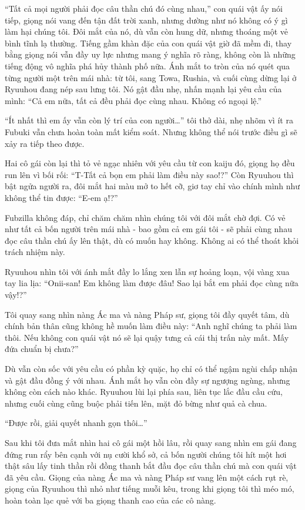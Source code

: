 \documentclass[../main.tex]{subfiles}
\begin{document}

``Tất cả mọi người phải đọc câu thần chú đó cùng nhau,'' con quái vật ấy nói tiếp, giọng nói vang đến tận đất trời xanh, nhưng dường như nó không có ý gì làm hại chúng tôi. Đôi mắt của nó, dù vẫn còn hung dữ, nhưng thoáng một vẻ bình tĩnh lạ thường. Tiếng gầm khàn đặc của con quái vật giờ đã mềm đi, thay bằng giọng nói vẫn đầy uy lực nhưng mang ý nghĩa rõ ràng, không còn là những tiếng động vô nghĩa phá hủy thành phố nữa. Ánh mắt to tròn của nó quét qua từng người một trên mái nhà: từ tôi, sang Towa, Rushia, và cuối cùng dừng lại ở Ryuuhou đang nép sau lưng tôi. Nó gật đầu nhẹ, nhấn mạnh lại yêu cầu của mình: ``Cả em nữa, tất cả đều phải đọc cùng nhau. Không có ngoại lệ.''

``Ít nhất thì em ấy vẫn còn lý trí của con người\dots'' tôi thở dài, nhẹ nhõm vì ít ra Fubuki vẫn chưa hoàn toàn mất kiểm soát. Nhưng không thể nói trước điều gì sẽ xảy ra tiếp theo được.

Hai cô gái còn lại thì tỏ vẻ ngạc nhiên với yêu cầu từ con kaiju đó, giọng họ đều run lên vì bối rối: ``T-Tất cả bọn em phải làm điều này sao!?'' Còn Ryuuhou thì bật ngửa người ra, đôi mắt hai màu mở to hết cỡ, giơ tay chỉ vào chính mình như không thể tin được: ``E-em ạ!?''

Fubzilla không đáp, chỉ chăm chăm nhìn chúng tôi với đôi mắt chờ đợi. Có vẻ như tất cả bốn người trên mái nhà - bao gồm cả em gái tôi - sẽ phải cùng nhau đọc câu thần chú ấy lên thật, dù có muốn hay không. Không ai có thể thoát khỏi trách nhiệm này.

Ryuuhou nhìn tôi với ánh mắt đầy lo lắng xen lẫn sự hoảng loạn, vội vàng xua tay lia lịa: ``Onii-san! Em không làm được đâu! Sao lại bắt em phải đọc cùng nữa vậy!?''

Tôi quay sang nhìn nàng Ác ma và nàng Pháp sư, giọng tôi đầy quyết tâm, dù chính bản thân cũng không hề muốn làm điều này: ``Anh nghĩ chúng ta phải làm thôi. Nếu không con quái vật nó sẽ lại quậy tưng cả cái thị trấn này mất. Mấy đứa chuẩn bị chưa?''

Dù vẫn còn sốc với yêu cầu có phần kỳ quặc, họ chỉ có thể ngậm ngùi chấp nhận và gật đầu đồng ý với nhau. Ánh mắt họ vẫn còn đầy sự ngượng ngùng, nhưng không còn cách nào khác. Ryuuhou lùi lại phía sau, liên tục lắc đầu cầu cứu, nhưng cuối cùng cũng buộc phải tiến lên, mặt đỏ bừng như quả cà chua.

``Được rồi, giải quyết nhanh gọn thôi\dots''

Sau khi tôi đưa mắt nhìn hai cô gái một hồi lâu, rồi quay sang nhìn em gái đang đứng run rẩy bên cạnh với nụ cười khổ sở, cả bốn người chúng tôi hít một hơi thật sâu lấy tinh thần rồi đồng thanh bắt đầu đọc câu thần chú mà con quái vật đã yêu cầu. Giọng của nàng Ác ma và nàng Pháp sư vang lên một cách rụt rè, giọng của Ryuuhou thì nhỏ như tiếng muỗi kêu, trong khi giọng tôi thì méo mó, hoàn toàn lạc quẻ với ba giọng thanh cao của các cô nàng.
\end{document}
